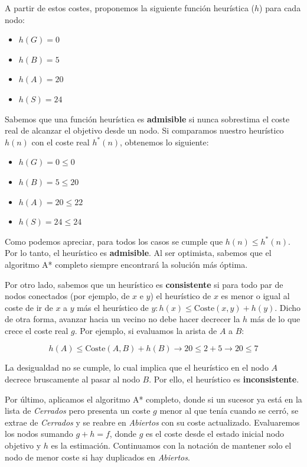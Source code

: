 \documentclass[11pt, a4paper]{article}
\newenvironment{problem}[1][Cuestión]{
	\vspace{0.5cm}
	\noindent{\Large\bfseries #1} \par\vspace{0.5cm}
}{
	\vspace{0.5cm}
}
\begin{document}
\begin{problem}[Cuestión 1 (20\%)]
{			A partir de estos costes, proponemos la siguiente función heurística ($h$) para cada nodo:

			\begin{itemize}
				\item $h(G) = 0$
				\item $h(B) = 5$
				\item $h(A) = 20$
				\item $h(S) = 24$
			\end{itemize}

			Sabemos que una función heurística es \textbf{admisible} si nunca sobrestima el coste real de alcanzar el objetivo desde un nodo. Si comparamos nuestro heurístico $h(n)$ con el coste real $h^*(n)$, obtenemos lo siguiente:

			\begin{itemize}
				\item $h(G) = 0 \le 0$
				\item $h(B) = 5 \le 20$
				\item $h(A) = 20 \le 22$
				\item $h(S) = 24 \le 24$
			\end{itemize}

			Como podemos apreciar, para todos los casos se cumple que $h(n) \le h^*(n)$. Por lo tanto, el heurístico es \textbf{admisible}. Al ser optimista, sabemos que el algoritmo A* completo siempre encontrará la solución más óptima.

			Por otro lado, sabemos que un heurístico es \textbf{consistente} si para todo par de nodos conectados (por ejemplo, de $x$ e $y$) el heurístico de $x$ es menor o igual al coste de ir de $x$ a $y$ más el heurístico de $y: h(x) \le \text{Coste}(x,y)+h(y)$. Dicho de otra forma, avanzar hacia un vecino no debe hacer decrecer la $h$ más de lo que crece el coste real $g$. Por ejemplo, si evaluamos la arista de $A$ a $B$:

			$$
			h(A) \le \text{Coste}(A,B) + h(B) \to 20 \le 2 + 5 \to 20 \le 7
			$$

			La desigualdad no se cumple, lo cual implica que el heurístico en el nodo $A$ decrece bruscamente al pasar al nodo $B$. Por ello, el heurístico es \textbf{inconsistente}.

			Por último, aplicamos el algoritmo A* completo, donde si un sucesor ya está en la lista de \textit{Cerrados} pero presenta un coste $g$ menor al que tenía cuando se cerró, se extrae de \textit{Cerrados} y se reabre en \textit{Abiertos} con su coste actualizado. Evaluaremos los nodos sumando $g + h = f$, donde $g$ es el coste desde el estado inicial nodo objetivo y $h$ es la estimación. Continuamos con la notación de mantener solo el nodo de menor coste si hay duplicados en \textit{Abiertos}.

}
\end{problem}
\end{document}
